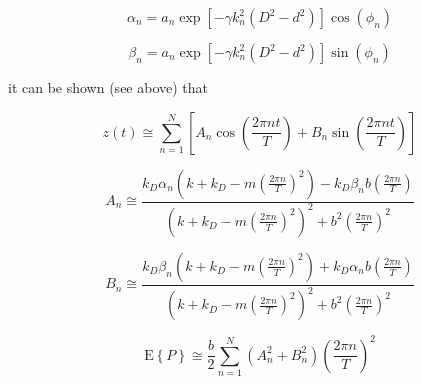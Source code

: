 $$ \alpha_n = a_n\exp[-\gamma k_n^2(D^2 - d^2)]\cos(\phi_n) $$

$$ \beta_n = a_n\exp[-\gamma k_n^2(D^2 - d^2)]\sin(\phi_n) $$

\noindent it can be shown (see above) that

$$ z(t) \cong \sum_{n=1}^{N} \left[A_n\cos\left(\frac{2\pi nt}{T}\right) + B_n\sin\left(\frac{2\pi nt}{T}\right)\right] $$

$$ A_n \cong \frac{k_D\alpha_n\left(k + k_D - m\left(\frac{2\pi n}{T}\right)^2\right) - k_D\beta_n b\left(\frac{2\pi n}{T}\right)}{\left(k + k_D - m\left(\frac{2\pi n}{T}\right)^2\right)^2 + b^2\left(\frac{2\pi n}{T}\right)^2} $$

$$ B_n \cong \frac{k_D\beta_n\left(k + k_D - m\left(\frac{2\pi n}{T}\right)^2\right) + k_D\alpha_n b\left(\frac{2\pi n}{T}\right)}{\left(k + k_D - m\left(\frac{2\pi n}{T}\right)^2\right)^2 + b^2\left(\frac{2\pi n}{T}\right)^2} $$

$$ \textrm{E}\left\{P\right\} \cong \frac{b}{2}\sum_{n=1}^{N}\left(A_n^2 + B_n^2\right)\left(\frac{2\pi n}{T}\right)^2 $$

